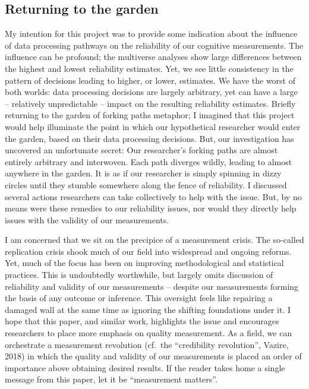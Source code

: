 \documentclass[
  english,
  man,floatsintext]{apa6}
\begin{document}
\hypertarget{returning-to-the-garden}{%
\subsection{Returning to the garden}\label{returning-to-the-garden}}

My intention for this project was to provide some indication about the influence of data processing pathways on the reliability of our cognitive measurements. The influence can be profound; the multiverse analyses show large differences between the highest and lowest reliability estimates. Yet, we see little consistency in the pattern of decisions leading to higher, or lower, estimates. We have the worst of both worlds: data processing decisions are largely arbitrary, yet can have a large -- relatively unpredictable -- impact on the resulting reliability estimates. Briefly returning to the garden of forking paths metaphor; I imagined that this project would help illuminate the point in which our hypothetical researcher would enter the garden, based on their data processing decisions. But, our investigation has uncovered an unfortunate secret: Our researcher's forking paths are almost entirely arbitrary and interwoven. Each path diverges wildly, leading to almost anywhere in the garden. It is as if our researcher is simply spinning in dizzy circles until they stumble somewhere along the fence of reliability. I discussed several actions researchers can take collectively to help with the issue. But, by no means were these remedies to our reliability issues, nor would they directly help issues with the validity of our measurements.

I am concerned that we sit on the precipice of a measurement crisis. The so-called replication crisis shook much of our field into widespread and ongoing reforms. Yet, much of the focus has been on improving methodological and statistical practices. This is undoubtedly worthwhile, but largely omits discussion of reliability and validity of our measurements -- despite our measurements forming the basis of any outcome or inference. This oversight feels like repairing a damaged wall at the same time as ignoring the shifting foundations under it. I hope that this paper, and similar work, highlights the issue and encourages researchers to place more emphasis on quality measurement. As a field, we can orchestrate a measurement revolution (cf.~the ``credibility revolution'', Vazire, 2018) in which the quality and validity of our measurements is placed an order of importance above obtaining desired results. If the reader takes home a single message from this paper, let it be \enquote{measurement matters}.
\end{document}
